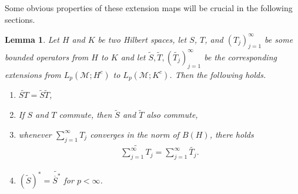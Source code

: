 \documentclass[psamsfonts]{amsart}
\newtheorem{lemma}[theorem]{Lemma}
\newcommand{\Lp}{L_p}
\begin{document}
    Some obvious properties of these extension maps will be crucial in the following sections.

    \begin{lemma}\label{lem:extensionProperties}
        Let $H$ and $K$ be two Hilbert spaces, let $S$, $T$, and $(T_j)_{j=1}^{\infty}$ be some bounded operators from $H$ to $K$ and let $\widetilde{S}, \widetilde{T}, (\widetilde{T_j})_{j=1}^{\infty}$ be the corresponding extensions from $\Lp(\mathcal{M};H^c)$ to $\Lp(\mathcal{M};K^c)$. Then the following holds.
        \begin{enumerate}
            \item $\widetilde{ST} = \widetilde{S}\widetilde{T}$,
            \item If $S$ and $T$ commute, then $\widetilde{S}$ and $\widetilde{T}$ also commute,
            \item whenever $\sum_{j=1}^{\infty} T_j$ converges in the norm of $B(H)$, there holds
            \begin{align*}
                \widetilde{\sum_{j=1}^\infty T_j} = \sum_{j=1}^{\infty} \widetilde{T_j}.
            \end{align*}
            \item $({\widetilde{S}})^*= \widetilde{\overline S^*}$ for $p<\infty$.
        \end{enumerate}
    \end{lemma}
\end{document}
